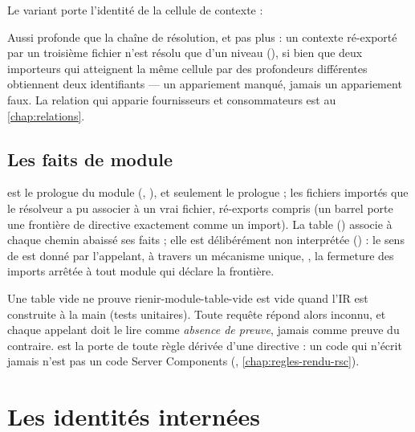 Le variant  porte l'identité de la cellule de contexte :


\og Aussi profonde que la chaîne de résolution, et pas plus\fg{} : un contexte ré-exporté par un troisième fichier n'est résolu que d'un niveau (), si bien que deux importeurs qui atteignent la même cellule par des profondeurs différentes obtiennent deux identifiants --- un appariement manqué, jamais un appariement faux. La relation qui apparie fournisseurs et consommateurs est au \cref{chap:relations}.

\subsection{Les faits de module}


 est le prologue du module (, ), et seulement le prologue ;  les fichiers importés que le résolveur a pu associer à un vrai fichier, ré-exports compris (un barrel porte une frontière de directive exactement comme un import). La table  () associe à chaque chemin abaissé ses faits ; elle est \og délibérément non interprétée\fg{} () : le sens de  est donné par l'appelant, à travers un mécanisme unique, , la fermeture des imports arrêtée à tout module qui déclare la frontière.

\begin{invariant}{Une table vide ne prouve rien}{ir-module-table-vide}
 est vide quand l'IR est construite à la main (tests unitaires). Toute requête répond alors \og inconnu\fg{}, et chaque appelant doit le lire comme \emph{absence de preuve}, jamais comme preuve du contraire.  est la porte de toute règle dérivée d'une directive : un code qui n'écrit jamais  n'est pas un code Server Components (, \cref{chap:regles-rendu-rsc}).
\end{invariant}

\section{Les identités internées}
\label{sec:ir-identites}

